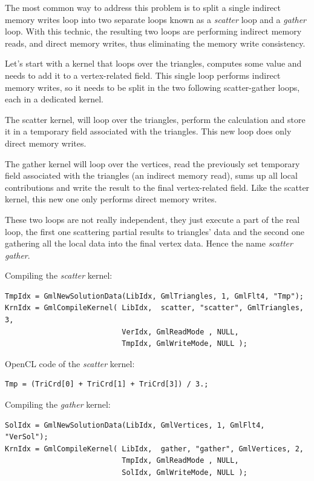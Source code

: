 \documentclass[a4paper,12pt]{article}
\begin{document}
The most common way to address this problem is to split a single indirect memory writes loop into two separate loops known as a \emph{scatter} loop and a \emph{gather} loop. With this technic, the resulting two loops are performing indirect memory reads, and direct memory writes, thus eliminating the memory write consistency.

Let's start with a kernel that loops over the triangles, computes some value and needs to add it to a vertex-related field. This single loop performs indirect memory writes, so it needs to be split in the two following scatter-gather loops, each in a dedicated kernel.

The scatter kernel, will loop over the triangles, perform the calculation and store it in a temporary field associated with the triangles. This new loop does only direct memory writes.

The gather kernel will loop over the vertices, read the previously set temporary field associated with the triangles (an indirect memory read), sums up all local contributions and write the result to the final vertex-related field. Like the scatter kernel, this new one only performs direct memory writes.

These two loops are not really independent, they just execute a part of the real loop, the first one scattering partial results to triangles' data and the second one gathering all the local data into the final vertex data. Hence the name \emph{scatter gather}.


Compiling the \emph{scatter} kernel:
\begin{tt}
\begin{verbatim}
TmpIdx = GmlNewSolutionData(LibIdx, GmlTriangles, 1, GmlFlt4, "Tmp");
KrnIdx = GmlCompileKernel( LibIdx,  scatter, "scatter", GmlTriangles, 3,
                           VerIdx, GmlReadMode , NULL,
                           TmpIdx, GmlWriteMode, NULL );
\end{verbatim}
\end{tt}
\normalfont

OpenCL code of the \emph{scatter} kernel:
\begin{tt}
\begin{verbatim}
Tmp = (TriCrd[0] + TriCrd[1] + TriCrd[3]) / 3.;
\end{verbatim}
\end{tt}
\normalfont

Compiling the \emph{gather} kernel:
\begin{tt}
\begin{verbatim}
SolIdx = GmlNewSolutionData(LibIdx, GmlVertices, 1, GmlFlt4, "VerSol");
KrnIdx = GmlCompileKernel( LibIdx,  gather, "gather", GmlVertices, 2,
                           TmpIdx, GmlReadMode , NULL,
                           SolIdx, GmlWriteMode, NULL );
\end{verbatim}
\end{tt}
\normalfont
\end{document}
